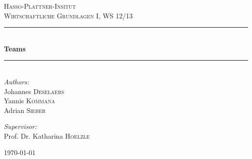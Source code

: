 \begin{titlepage}

\begin{center}



\textsc{\LARGE Hasso-Plattner-Insitut}\\[1.5cm]

\textsc{\Large Wirtschaftliche Grundlagen I, WS 12/13}
\\[0.5cm]


\rule{\linewidth}{0.5mm} \\[0.4cm]
{ \huge \bfseries Teams }\\[0.4cm]
\rule{\linewidth}{0.5mm} \\[1.5cm]


	\emph{Authors:}\\
	Johannes \textsc{Deselaers}\\
	Yannis \textsc{Kommana}\\
	Adrian \textsc{Sieber}

\vspace{1cm}

	\emph{Supervisor:} \\
	Prof. Dr. Katharina \textsc{Hoelzle}


\vfill

{\large \today}
\end{center}



\end{titlepage}